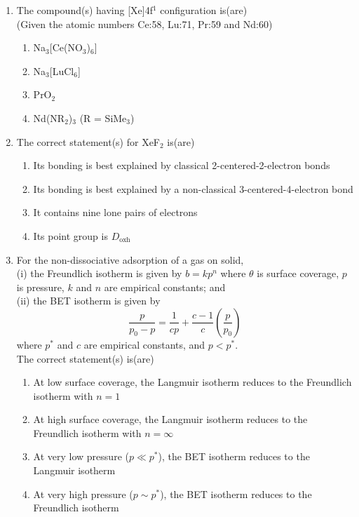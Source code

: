\documentclass[journal,12pt,onecolumn]{IEEEtran}
\theoremstyle{remark}
\begin{document}
\begin{enumerate}
\item The compound(s) having [Xe]4f$^1$ configuration is(are) \\
(Given the atomic numbers Ce:58, Lu:71, Pr:59 and Nd:60)
\begin{multicols}{2}
\begin{enumerate}
\item Na$_3$[Ce(NO$_3$)$_6$]
\item Na$_3$[LuCl$_6$]
\item PrO$_2$
\item Nd(NR$_2$)$_3$ (R = SiMe$_3$)
\end{enumerate}
\end{multicols}

\item The correct statement(s) for XeF$_2$ is(are)
\begin{multicols}{2}
\begin{enumerate}
\item Its bonding is best explained by classical 2-centered-2-electron bonds
\item Its bonding is best explained by a non-classical 3-centered-4-electron bond
\item It contains nine lone pairs of electrons
\item Its point group is $D_{\mathrm{oxh}}$
\end{enumerate}
\end{multicols}




\item For the non-dissociative adsorption of a gas on solid, \\
(i) the Freundlich isotherm is given by $b = kp^n$ where $\theta$ is surface coverage, $p$ is pressure, $k$ and $n$ are empirical constants; and \\
(ii) the BET isotherm is given by 
\[
\frac{p}{p_0 - p} = \frac{1}{cp} + \frac{c-1}{c} \left(\frac{p}{p_0}\right)
\]
where $p^*$ and $c$ are empirical constants, and $p < p^*$. \\
The correct statement(s) is(are)
\begin{multicols}{2}
\begin{enumerate}
\item At low surface coverage, the Langmuir isotherm reduces to the Freundlich isotherm with $n=1$
\item At high surface coverage, the Langmuir isotherm reduces to the Freundlich isotherm with $n = \infty$
\item At very low pressure ($p \ll p^*$), the BET isotherm reduces to the Langmuir isotherm
\item At very high pressure ($p \sim p^*$), the BET isotherm reduces to the Freundlich isotherm
\end{enumerate}
\end{multicols}


\end{enumerate}
\end{document}
